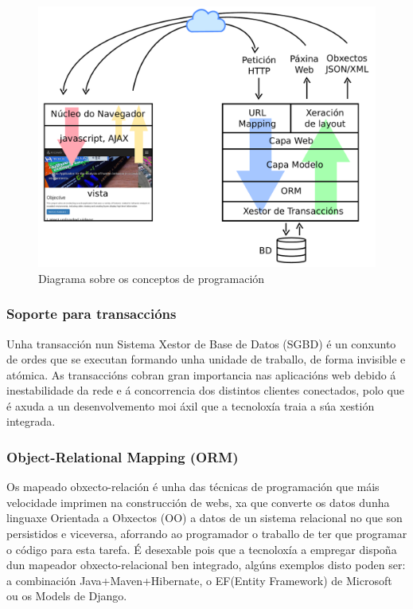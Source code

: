     \begin{figure}[htp]
    \begin{center}
        \includegraphics[scale=0.4]{figures/fundamentos.pdf}
        \caption{Diagrama sobre os conceptos de programación}
    \label{fig:fundamentos}
    \end{center}
    \end{figure}
		
        \subsubsection{Soporte para transaccións}
            Unha transacción nun Sistema Xestor de Base de Datos (SGBD) é un conxunto de ordes que
            se executan formando unha unidade de traballo, de forma invisible e atómica. 
            As transaccións cobran gran importancia nas aplicacións web debido á inestabilidade 
            da rede e á concorrencia dos distintos clientes conectados, polo que é axuda a un 
            desenvolvemento moi áxil que a tecnoloxía traia a súa xestión integrada.
        
        \subsubsection{Object-Relational Mapping (ORM)}
            Os mapeado obxecto-relación é unha das técnicas de programación que máis velocidade imprimen
            na construcción de webs, xa que converte os datos dunha linguaxe Orientada a Obxectos (OO) a 
            datos de un sistema relacional no que son persistidos e viceversa, aforrando ao programador
            o traballo de ter que programar o código para esta tarefa. É desexable pois que a tecnoloxía
            a empregar dispoña dun mapeador obxecto-relacional ben integrado, algúns exemplos disto poden
            ser: a combinación Java+Maven+Hibernate, o EF(Entity Framework) de Microsoft ou os Models de Django.
        

